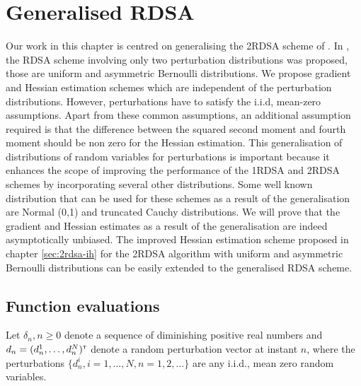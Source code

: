 \chapter{Generalised RDSA }
\label{sec:2rdsa-gen}
Our work in this chapter  is centred on generalising the 2RDSA scheme of \cite{prashanth2015rdsa}. In \cite{prashanth2015rdsa}, the RDSA scheme involving only two perturbation distributions was proposed, those are uniform and asymmetric Bernoulli distributions. We propose gradient and Hessian estimation schemes which are independent of the perturbation distributions. However, perturbations have to satisfy the i.i.d, mean-zero assumptions. Apart from these common assumptions,  an additional assumption required is that the difference between the squared second moment  and fourth moment should be non zero for the Hessian estimation. This generalisation of distributions of random variables for perturbations is important because it enhances the scope of improving the performance of the 1RDSA and 2RDSA schemes by incorporating several other distributions. Some well known distribution that can be used for these schemes as a result of the generalisation are Normal (0,1) and truncated Cauchy distributions. We will prove that  the  gradient and Hessian estimates as a result of the generalisation are indeed asymptotically unbiased.
 The improved Hessian estimation scheme proposed in chapter \ref{sec:2rdsa-ih} for the  2RDSA algorithm with uniform and asymmetric Bernoulli distributions can be easily extended to the generalised RDSA scheme.

\section{Function evaluations}
Let $\delta_n, n\geq 0$ denote a sequence of diminishing positive real numbers and $d_n = (d_n^1,\ldots,d_n^N)^\mathsf{\scriptscriptstyle T}$ denote a random perturbation vector at instant $n$,
where the perturbations $\{d_n^i, i=1,\ldots,N, n=1,2,\ldots\}$ are any i.i.d., mean zero random variables. 

